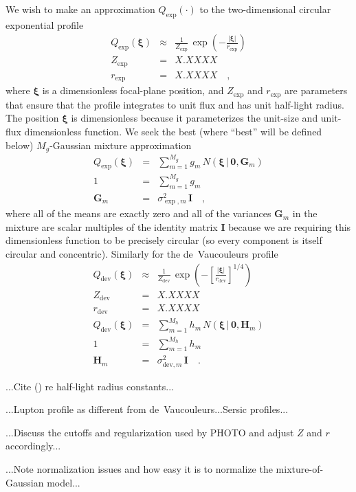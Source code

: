 \documentclass[12pt,pdftex,preprint]{aastex}
\newcommand{\tmatrix}[1]{\boldsymbol{#1}}
\newcommand{\tvector}[1]{\boldsymbol{#1}}
\newcommand{\spos}{\tvector{\xi}}
\newcommand{\Gm}{\tmatrix{G}}
\newcommand{\Hm}{\tmatrix{H}}
\newcommand{\zero}{\tmatrix{0}}
\newcommand{\identity}{\tmatrix{I}}
\newcommand{\normal}{N}
\newcommand{\given}{\,|\,}
\newcommand{\dev}{\mathrm{dev}}
\begin{document}
We wish to make an approximation $Q_{\exp}(\cdot)$ to the
two-dimensional circular exponential profile
\begin{eqnarray}\displaystyle
Q_{\exp}(\spos) &\approx& \frac{1}{Z_{\exp}}\,\exp(-\frac{|\spos|}{r_{\exp}})
\\
Z_{\exp} &=& X.XXXX
\\
r_{\exp} &=& X.XXXX
\quad ,
\end{eqnarray}
where $\spos$ is a dimensionless focal-plane position, and $Z_{\exp}$
and $r_{\exp}$ are parameters that ensure that the profile integrates
to unit flux and has unit half-light radius.  The position $\spos$ is
dimensionless because it parameterizes the unit-size and unit-flux
dimensionless function.  We seek the best (where ``best'' will be
defined below) $M_g$-Gaussian mixture approximation
\begin{eqnarray}\displaystyle
Q_{\exp}(\spos) &=& \sum_{m=1}^{M_g} g_m\,\normal(\spos\given\zero,\Gm_m)
\\
1 &=& \sum_{m=1}^{M_g} g_m
\\
\Gm_m &=& \sigma^2_{\exp,m}\,\identity
\quad ,
\end{eqnarray}
where all of the means are exactly zero and all of the variances
$\Gm_m$ in the mixture are scalar multiples of the identity matrix
$\identity$ because we are requiring this dimensionless function to be
precisely circular (so every component is itself circular and
concentric).  Similarly for the de~Vaucouleurs profile
\begin{eqnarray}\displaystyle
Q_{\dev}(\spos) &\approx& \frac{1}{Z_{\dev}}\,\exp(-\left[\frac{|\spos|}{r_{\dev}}\right]^{1/4})
\\
Z_{\dev} &=& X.XXXX
\\
r_{\dev} &=& X.XXXX
\\
Q_{\dev}(\spos) &=& \sum_{m=1}^{M_h} h_m\,\normal(\spos\given\zero,\Hm_m)
\\
1 &=& \sum_{m=1}^{M_h} h_m
\\
\Hm_m &=& \sigma^2_{\dev,m}\,\identity
\quad .
\end{eqnarray}

...Cite (\citealt{ciotti}) re half-light radius constants...

...Lupton profile as different from de~Vaucouleurs...Sersic profiles...

...Discuss the cutoffs and regularization used by PHOTO and adjust $Z$ and $r$ accordingly...

...Note normalization issues and how easy it is to normalize the mixture-of-Gaussian model...
\end{document}
